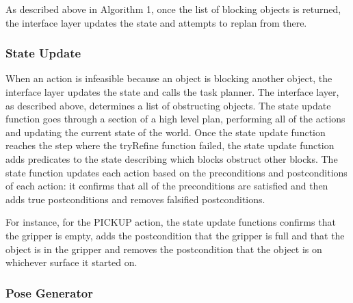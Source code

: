 \documentclass[12pt]{article}
\begin{document}
As described above in Algorithm 1, once the list of blocking objects is returned, the interface layer updates the state and attempts to replan from there.

\subsubsection{State Update}


When an action is infeasible because an object is blocking another object, the interface layer updates the state and calls the task planner. 
The interface layer, as described above, determines a list of obstructing objects.
The state update function goes through a section of a high level plan, performing all of the actions and updating the current state of the world.
Once the state update function reaches the step where the tryRefine function failed, the state update function adds predicates to the state describing which blocks obstruct other blocks.
The state function updates each action based on the preconditions and postconditions of each action: it confirms that all of the preconditions are satisfied and then adds true postconditions and removes falsified postconditions.  

For instance, for the PICKUP action, the state update functions confirms that the gripper is empty, adds the postcondition that the gripper is full and that the object is in the gripper and removes the postcondition that the object is on whichever surface it started on.


\subsubsection{Pose Generator}
\end{document}
